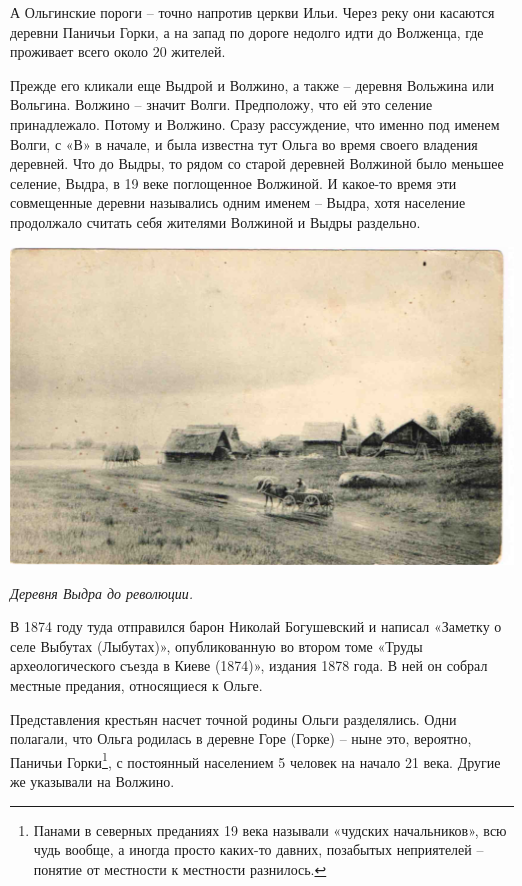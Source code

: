 А Ольгинские пороги – точно напротив церкви Ильи. Через реку они касаются деревни Паничьи Горки, а на запад по дороге недолго идти до Волженца, где проживает всего около 20 жителей. 

Прежде его кликали еще Выдрой и Волжино, а также – деревня Вольжина или Вольгина. Волжино – значит Волги. Предположу, что ей это селение принадлежало. Потому и Волжино. Сразу рассуждение, что именно под именем Волги, с «В» в начале, и была известна тут Ольга во время своего владения деревней.
%
%
Что до Выдры, то рядом со старой деревней Волжиной было меньшее селение, Выдра, в 19 веке поглощенное Волжиной. И какое-то время эти совмещенные деревни назывались одним именем – Выдра, хотя население продолжало считать себя жителями Волжиной и Выдры раздельно.

\begin{center}
\includegraphics[width=\linewidth]{chast-volga/vybuty/vydra.jpg}

\textit{Деревня Выдра до революции.}
\end{center}

В 1874 году туда отправился барон Николай Богушевский и написал «Заметку о селе Выбутах (Лыбутах)», опубликованную во втором томе «Труды археологического съезда в Киеве (1874)», издания 1878 года. В ней он собрал местные предания, относящиеся к Ольге.

Представления крестьян насчет точной родины Ольги разделялись. Одни полагали, что Ольга родилась в деревне Горе (Горке) – ныне это, вероятно, Паничьи Горки\footnote{Панами в северных преданиях 19 века называли «чудских начальников», всю чудь вообще, а иногда просто каких-то давних, позабытых неприятелей – понятие от местности к местности разнилось.}, с постоянный населением 5 человек на начало 21 века. Другие же указывали на Волжино.

